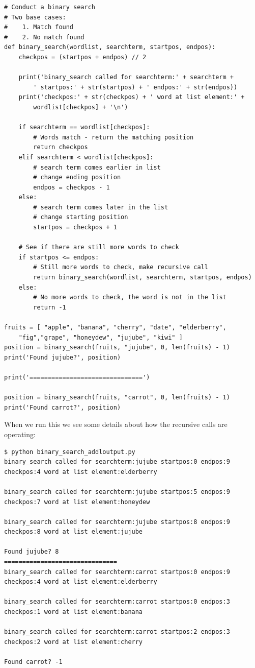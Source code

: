 \beforeverb
\begin{verbatim}
# Conduct a binary search
# Two base cases:
#    1. Match found
#    2. No match found
def binary_search(wordlist, searchterm, startpos, endpos):
    checkpos = (startpos + endpos) // 2

    print('binary_search called for searchterm:' + searchterm +  
        ' startpos:' + str(startpos) + ' endpos:' + str(endpos))
    print('checkpos:' + str(checkpos) + ' word at list element:' + 
        wordlist[checkpos] + '\n')

    if searchterm == wordlist[checkpos]:
        # Words match - return the matching position
        return checkpos
    elif searchterm < wordlist[checkpos]:
        # search term comes earlier in list
        # change ending position
        endpos = checkpos - 1
    else:
        # search term comes later in the list
        # change starting position
        startpos = checkpos + 1

    # See if there are still more words to check
    if startpos <= endpos:
        # Still more words to check, make recursive call
        return binary_search(wordlist, searchterm, startpos, endpos)
    else:
        # No more words to check, the word is not in the list
        return -1

fruits = [ "apple", "banana", "cherry", "date", "elderberry", 
    "fig","grape", "honeydew", "jujube", "kiwi" ]
position = binary_search(fruits, "jujube", 0, len(fruits) - 1)
print('Found jujube?', position)
    
print('===============================')

position = binary_search(fruits, "carrot", 0, len(fruits) - 1)
print('Found carrot?', position)
\end{verbatim}
\afterverb

When we run this we see some details about how the recursive calls are operating:

\beforeverb
\begin{verbatim}
$ python binary_search_addloutput.py 
binary_search called for searchterm:jujube startpos:0 endpos:9
checkpos:4 word at list element:elderberry

binary_search called for searchterm:jujube startpos:5 endpos:9
checkpos:7 word at list element:honeydew

binary_search called for searchterm:jujube startpos:8 endpos:9
checkpos:8 word at list element:jujube

Found jujube? 8
===============================
binary_search called for searchterm:carrot startpos:0 endpos:9
checkpos:4 word at list element:elderberry

binary_search called for searchterm:carrot startpos:0 endpos:3
checkpos:1 word at list element:banana

binary_search called for searchterm:carrot startpos:2 endpos:3
checkpos:2 word at list element:cherry

Found carrot? -1
\end{verbatim}
\afterverb

